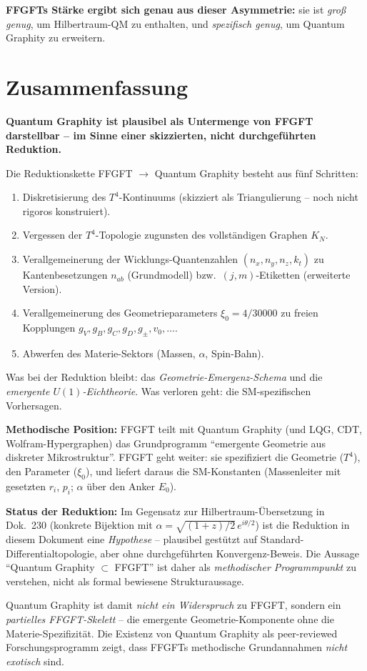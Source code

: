 \textbf{FFGFTs Stärke ergibt sich genau aus dieser Asymmetrie:}
sie ist \emph{groß genug}, um Hilbertraum-QM zu enthalten, und
\emph{spezifisch genug}, um Quantum Graphity zu erweitern.

\section{Zusammenfassung}

\textbf{Quantum Graphity ist plausibel als Untermenge von FFGFT
darstellbar -- im Sinne einer skizzierten, nicht durchgeführten
Reduktion.}

Die Reduktionskette FFGFT $\to$ Quantum Graphity besteht aus fünf
Schritten:
\begin{enumerate}[leftmargin=2em,itemsep=2pt,topsep=2pt]
  \item Diskretisierung des $T^4$-Kontinuums (skizziert als
        Triangulierung -- noch nicht rigoros konstruiert).
  \item Vergessen der $T^4$-Topologie zugunsten des vollständigen
        Graphen $K_N$.
  \item Verallgemeinerung der Wicklungs-Quantenzahlen
        $(n_x, n_y, n_z, k_t)$ zu Kantenbesetzungen $n_{ab}$
        (Grundmodell) bzw.\ $(j, m)$-Etiketten (erweiterte Version).
  \item Verallgemeinerung des Geometrieparameters $\xi_0 = 4/30000$
        zu freien Kopplungen $g_V, g_B, g_C, g_D, g_\pm, v_0, \ldots$.
  \item Abwerfen des Materie-Sektors (Massen, $\alpha$, Spin-Bahn).
\end{enumerate}

Was bei der Reduktion bleibt: das \emph{Geometrie-Emergenz-Schema}
und die \emph{emergente $U(1)$-Eichtheorie}. Was verloren geht: die
SM-spezifischen Vorhersagen.

\textbf{Methodische Position:} FFGFT teilt mit Quantum Graphity (und
LQG, CDT, Wolfram-Hypergraphen) das Grundprogramm \enquote{emergente
Geometrie aus diskreter Mikrostruktur}. FFGFT geht weiter: sie
spezifiziert die Geometrie ($T^4$), den Parameter ($\xi_0$), und
liefert daraus die SM-Konstanten (Massenleiter mit gesetzten
$r_i$, $p_i$; $\alpha$ über den Anker $E_0$).

\textbf{Status der Reduktion:} Im Gegensatz zur Hilbertraum-Übersetzung
in Dok.~230 (konkrete Bijektion mit $\alpha = \sqrt{(1+z)/2}\,e^{i\theta/2}$)
ist die Reduktion in diesem Dokument eine \emph{Hypothese} -- plausibel
gestützt auf Standard-Differentialtopologie, aber ohne durchgeführten
Konvergenz-Beweis. Die Aussage \enquote{Quantum Graphity $\subset$
FFGFT} ist daher als \emph{methodischer Programmpunkt} zu verstehen,
nicht als formal bewiesene Strukturaussage.

Quantum Graphity ist damit \emph{nicht ein Widerspruch} zu FFGFT,
sondern ein \emph{partielles FFGFT-Skelett} -- die emergente
Geometrie-Komponente ohne die Materie-Spezifizität. Die Existenz
von Quantum Graphity als peer-reviewed Forschungsprogramm zeigt,
dass FFGFTs methodische Grundannahmen \emph{nicht exotisch} sind.
